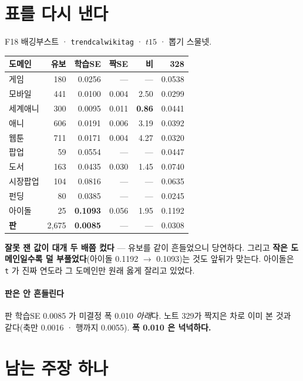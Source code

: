 \documentclass[10pt]{article}
\begin{document}
\section{표를 다시 낸다}

F18 배깅부스트 · \texttt{trendcalwikitag} · $t15$ · 뽑기 스물넷.

\begin{center}\footnotesize
\begin{tabular}{lrrrrr}
\hline
도메인 & 유보 & 학습SE & 짝SE & 비 & 328 \\
\hline
게임 & 180 & 0.0256 & --- & --- & 0.0538 \\
모바일 & 441 & 0.0100 & 0.004 & 2.50 & 0.0299 \\
세계애니 & 300 & 0.0095 & 0.011 & \textbf{0.86} & 0.0441 \\
애니 & 606 & 0.0191 & 0.006 & 3.19 & 0.0392 \\
웹툰 & 711 & 0.0171 & 0.004 & 4.27 & 0.0320 \\
팝업 & 59 & 0.0554 & --- & --- & 0.0447 \\
도서 & 163 & 0.0435 & 0.030 & 1.45 & 0.0740 \\
시장팝업 & 104 & 0.0816 & --- & --- & 0.0635 \\
펀딩 & 80 & 0.0385 & --- & --- & 0.0245 \\
아이돌 & 25 & \textbf{0.1093} & 0.056 & 1.95 & 0.1192 \\
\hline
\textbf{판} & 2,675 & \textbf{0.0085} & --- & --- & 0.0308 \\
\hline
\end{tabular}
\end{center}

\textbf{잘못 잰 값이 대개 두 배쯤 컸다} --- 유보를 같이 흔들었으니
당연하다. 그리고 \textbf{작은 도메인일수록 덜 부풀었다}(아이돌 0.1192
$\to$ 0.1093)는 것도 앞뒤가 맞는다. 아이돌은 \texttt{t} 가 진짜 연도라
그 도메인만 원래 옳게 잘리고 있었다.

\paragraph{판은 안 흔들린다} 판 학습SE 0.0085 가 미결정 폭 0.010
\emph{아래}다. 노트 329가 짝지은 차로 이미 본 것과 같다(축만 0.0016 ·
행까지 0.0055). \textbf{폭 0.010 은 넉넉하다.}

\section{남는 주장 하나}
\end{document}
